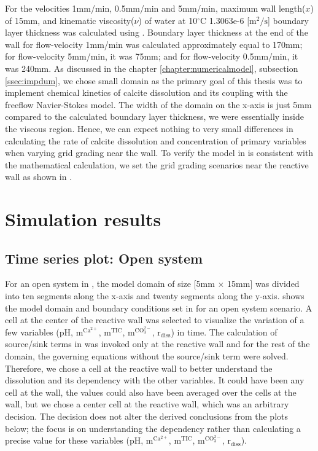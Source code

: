 For the velocities 1mm/min, 0.5mm/min and 5mm/min, maximum wall length($x$) of 15mm, and kinematic viscosity($\nu$) of 
water at 10$^\circ$C 1.3063e-6 [$\mathrm{m^2/s}$] \cite{wagner2008iapws} boundary layer thickness was calculated using . 
Boundary layer thickness at the end of the wall for flow-velocity 1mm/min was calculated approximately equal to 170mm; 
for flow-velocity 5mm/min, it was 75mm; and for flow-velocity 0.5mm/min, it was 240mm. As discussed in the chapter 
\ref{chapter:numericalmodel}, subsection \ref{ssec:impdum}, we chose small domain as the primary goal of this thesis was to 
implement chemical kinetics of calcite dissolution and its coupling with the freeflow Navier-Stokes model. 
The width of the domain on the x-axis is just 5mm compared to the calculated boundary layer thickness, we were essentially 
inside the viscous region. Hence, we can expect nothing to very small differences in calculating the rate of calcite dissolution and concentration 
of primary variables when varying grid grading near the wall. To verify the model in \DuMuX is 
consistent with the mathematical calculation, we set the grid grading scenarios near the reactive wall as shown in . \\

\section{\DuMuX Simulation results}

\subsection{Time series plot: Open system}\label{ssec:timeSeriesOpen}
For an open system in \DuMuX, the model domain of size [5mm $\times$ 15mm] was divided into ten segments along the x-axis and twenty segments along the y-axis. 
 shows the model domain and boundary conditions set in \DuMuX for an open system scenario. 
A cell at the center of the reactive wall was selected to visualize the variation of a few variables (pH, $\mathrm{m^{Ca^{2+}}}$, $\mathrm{m^{TIC}}$, 
$\mathrm{m^{CO_3^{2-}}}$, $\mathrm{r_{diss}}$) in time.  
The calculation of source/sink terms in \DuMuX was invoked only at the reactive wall and for the rest of 
the domain, the governing equations without the source/sink term were solved. \\
Therefore, we chose a cell at the reactive wall to better understand the dissolution
and its dependency with the other variables. It could have been any cell at the wall, the values could also have been averaged over the cells at the wall, but we 
chose a center cell at the reactive wall, which was an arbitrary decision. The decision does not alter the derived conclusions from the plots below; the focus is on 
understanding the dependency rather than calculating a precise value for these variables (pH, $\mathrm{m^{Ca^{2+}}}$, $\mathrm{m^{TIC}}$, 
$\mathrm{m^{CO_3^{2-}}}$, $\mathrm{r_{diss}}$).

